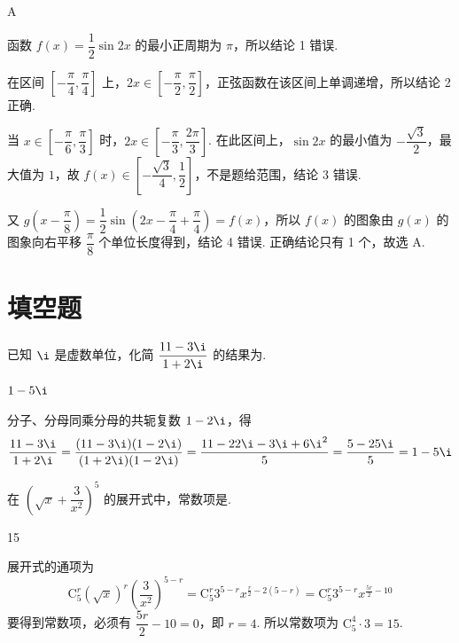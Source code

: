 \begin{answer}
A
\end{answer}

\begin{solution}
函数 \(f(x)=\dfrac12\sin2x\) 的最小正周期为 \(\pi\)，所以结论 1 错误.

在区间 \(\left[-\dfrac\pi4,\dfrac\pi4\right]\) 上，\(2x\in\left[-\dfrac\pi2,\dfrac\pi2\right]\)，正弦函数在该区间上单调递增，所以结论 2 正确.

当 \(x\in\left[-\dfrac\pi6,\dfrac\pi3\right]\) 时，\(2x\in\left[-\dfrac\pi3,\dfrac{2\pi}3\right]\). 在此区间上，\(\sin2x\) 的最小值为 \(-\dfrac{\sqrt3}{2}\)，最大值为 \(1\)，故
\(f(x)\in\left[-\dfrac{\sqrt3}{4},\dfrac12\right]\)，不是题给范围，结论 3 错误.

又
\(g\left(x-\dfrac\pi8\right)=\dfrac12\sin\left(2x-\dfrac\pi4+\dfrac\pi4\right)=f(x)\)，所以 \(f(x)\) 的图象由 \(g(x)\) 的图象向右平移 \(\dfrac\pi8\) 个单位长度得到，结论 4 错误. 正确结论只有 1 个，故选 A.
\end{solution}

\section{填空题}

\begin{problem}
已知 \(\i\) 是虚数单位，化简 \(\dfrac{11-3\i}{1+2\i}\) 的结果为\fillinblank{}.
\end{problem}

\begin{answer}
\(1-5\i\)
\end{answer}

\begin{solution}
分子、分母同乘分母的共轭复数 \(1-2\i\)，得
\[
\frac{11-3\i}{1+2\i}
=\frac{(11-3\i)(1-2\i)}{(1+2\i)(1-2\i)}
=\frac{11-22\i-3\i+6\i^2}{5}
=\frac{5-25\i}{5}=1-5\i
\]
\end{solution}

\begin{problem}
在 \(\left(\sqrt{x}+\dfrac{3}{x^2}\right)^5\) 的展开式中，常数项是\fillinblank{}.
\end{problem}

\begin{answer}
15
\end{answer}

\begin{solution}
展开式的通项为
\[
\mathrm C_5^r(\sqrt{x})^r\left(\frac{3}{x^2}\right)^{5-r}
=\mathrm C_5^r3^{5-r}x^{\frac r2-2(5-r)}
=\mathrm C_5^r3^{5-r}x^{\frac{5r}{2}-10}
\]
要得到常数项，必须有 \(\dfrac{5r}{2}-10=0\)，即 \(r=4\). 所以常数项为 \(\mathrm C_5^4\cdot3=15\).
\end{solution}


